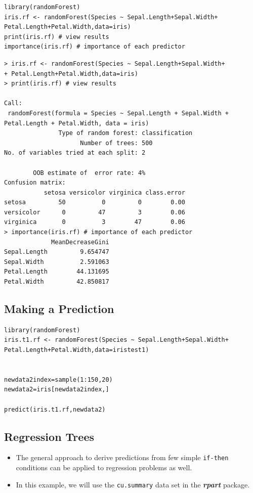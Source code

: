 \documentclass[caret-main.tex]{subfiles}
\begin{document}
\begin{framed}
\begin{verbatim}
library(randomForest)
iris.rf <- randomForest(Species ~ Sepal.Length+Sepal.Width+
Petal.Length+Petal.Width,data=iris)
print(iris.rf) # view results 
importance(iris.rf) # importance of each predictor
\end{verbatim}
\end{framed}
\begin{verbatim}
> iris.rf <- randomForest(Species ~ Sepal.Length+Sepal.Width+
+ Petal.Length+Petal.Width,data=iris)
> print(iris.rf) # view results 

Call:
 randomForest(formula = Species ~ Sepal.Length + Sepal.Width +      Petal.Length + Petal.Width, data = iris) 
               Type of random forest: classification
                     Number of trees: 500
No. of variables tried at each split: 2

        OOB estimate of  error rate: 4%
Confusion matrix:
           setosa versicolor virginica class.error
setosa         50          0         0        0.00
versicolor      0         47         3        0.06
virginica       0          3        47        0.06
> importance(iris.rf) # importance of each predictor
             MeanDecreaseGini
Sepal.Length         9.654747
Sepal.Width          2.591063
Petal.Length        44.131695
Petal.Width         42.850817

\end{verbatim}
\subsection*{Making a Prediction}
\begin{framed}
\begin{verbatim}
library(randomForest)
iris.t1.rf <- randomForest(Species ~ Sepal.Length+Sepal.Width+
Petal.Length+Petal.Width,data=iristest1)


newdata2index=sample(1:150,20)
newdata2=iris[newdata2index,]

predict(iris.t1.rf,newdata2)
\end{verbatim}
\end{framed}
\newpage
\subsection{Regression Trees}

\begin{itemize}
\item The general approach to derive predictions from few simple \texttt{if-then} conditions can be applied to regression problems as well. 
\item In this example, we will use the \texttt{cu.summary} data set in the \textbf{\textit{rpart}} package.
\end{itemize}
\end{document}
